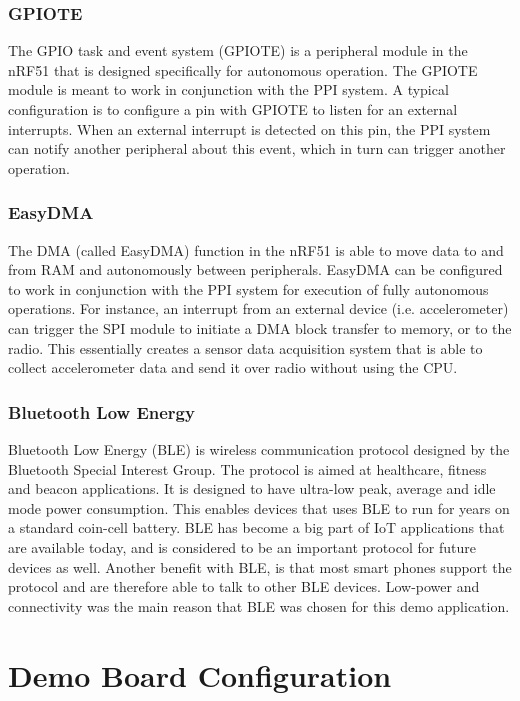 \subsubsection{GPIOTE}

The GPIO task and event system (GPIOTE) is a peripheral module in the nRF51 that is designed specifically for autonomous operation. The GPIOTE module is meant to work in conjunction with the PPI system. A typical configuration is to configure a pin with GPIOTE to listen for an external interrupts. When an external interrupt is detected on this pin, the PPI system can notify another peripheral about this event, which in turn can trigger another operation.

\subsubsection{EasyDMA}

The DMA (called EasyDMA) function in the nRF51 is able to move data to and from RAM and autonomously between peripherals. EasyDMA can be configured to work in conjunction with the PPI system for execution of fully autonomous operations. For instance, an interrupt from an external device (i.e. accelerometer) can trigger the SPI module to initiate a DMA block transfer to memory, or to the radio. This essentially creates a sensor data acquisition system that is able to collect accelerometer data and send it over radio without using the CPU.

\subsubsection{Bluetooth Low Energy}

Bluetooth Low Energy (BLE) is wireless communication protocol designed by the Bluetooth Special Interest Group. The protocol is aimed at healthcare, fitness and beacon applications. It is designed to have ultra-low peak, average and idle mode power consumption. This enables devices that uses BLE to run for years on a standard coin-cell battery. BLE has become a big part of IoT applications that are available today, and is considered to be an important protocol for future devices as well. Another benefit with BLE, is that most smart phones support the protocol and are therefore able to talk to other BLE devices. Low-power and connectivity was the main reason that BLE was chosen for this demo application. 

\section{Demo Board Configuration}

